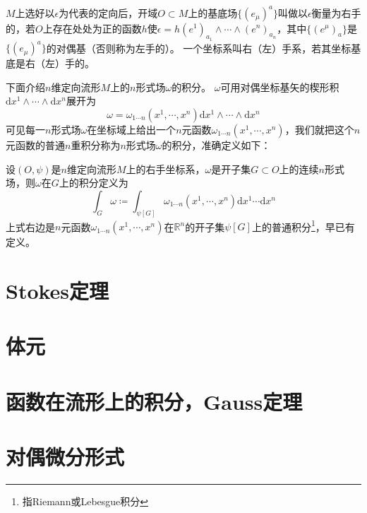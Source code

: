 \begin{definition}
    $M$上选好以$\epsilon$为代表的定向后，开域$O \subset M$上的基底场$\{(e_\mu)^a\}$叫做以$\epsilon$衡量为右手的，若$O$上存在处处为正的函数$h$使$\epsilon = h(e^1)_{a_1} \wedge \cdots \wedge (e^n)_{a_n}$，其中$\{(e^\mu)_a\}$是$\{(e_\mu)^a\}$的对偶基（否则称为左手的）。
    一个坐标系叫右（左）手系，若其坐标基底是右（左）手的。
\end{definition}

下面介绍$n$维定向流形$M$上的$n$形式场$\omega$的积分。
$\omega$可用对偶坐标基矢的楔形积$\mathrm{d}x^1 \wedge \cdots \wedge \mathrm{d}x^n$展开为
$$\omega = \omega_{1 \cdots n}(x^1, \cdots, x^n)\mathrm{d}x^1 \wedge \cdots \wedge \mathrm{d}x^n$$
可见每一$n$形式场$\omega$在坐标域上给出一个$n$元函数$\omega_{1 \cdots n}(x^1, \cdots, x^n)$，我们就把这个$n$元函数的普通$n$重积分称为$n$形式场$\omega$的积分，准确定义如下：

\begin{definition}
    设$(O, \psi)$是$n$维定向流形$M$上的右手坐标系，$\omega$是开子集$G \subset O$上的连续$n$形式场，则$\omega$在$G$上的积分定义为
    $$\int_G\omega \coloneq \int_{\psi[G]}\omega_{1 \cdots n}(x^1, \cdots, x^n)\mathrm{d}x^1 \cdots \mathrm{d}x^n$$
    上式右边是$n$元函数$\omega_{1 \cdots n}(x^1, \cdots, x^n)$在$\mathbb{R}^n$的开子集$\psi[G]$上的普通积分\footnote{指Riemann或Lebesgue积分}，早已有定义。
\end{definition}

\section{Stokes定理}

\section{体元}

\section{函数在流形上的积分，Gauss定理}

\section{对偶微分形式}

